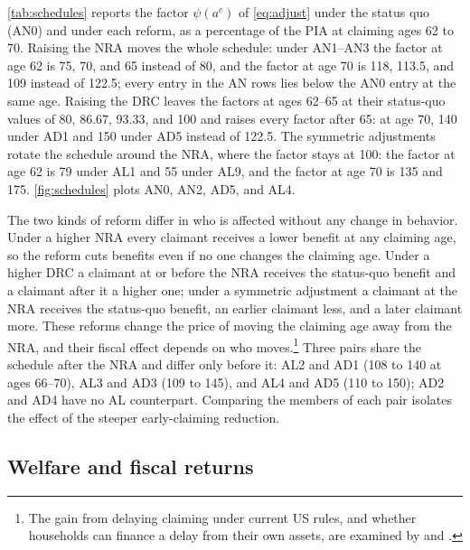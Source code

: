 

\autoref{tab:schedules} reports the factor $\psi(a^c)$ of \eqref{eq:adjust} under the status quo (AN0) and under each reform, as a percentage of the PIA at claiming ages 62 to 70. Raising the NRA moves the whole schedule: under AN1--AN3 the factor at age 62 is 75, 70, and 65 instead of 80, and the factor at age 70 is 118, 113.5, and 109 instead of 122.5; every entry in the AN rows lies below the AN0 entry at the same age. %
Raising the DRC leaves the factors at ages 62--65 at their status-quo values of 80, 86.67, 93.33, and 100 and raises every factor after 65: at age 70, 140 under AD1 and 150 under AD5 instead of 122.5. %
The symmetric adjustments rotate the schedule around the NRA, where the factor stays at 100: the factor at age 62 is 79 under AL1 and 55 under AL9, and the factor at age 70 is 135 and 175. %
\autoref{fig:schedules} plots AN0, AN2, AD5, and AL4. %

The two kinds of reform differ in who is affected without any change in behavior. Under a higher NRA every claimant receives a lower benefit at any claiming age, so the reform cuts benefits even if no one changes the claiming age. %
Under a higher DRC a claimant at or before the NRA receives the status-quo benefit and a claimant after it a higher one; under a symmetric adjustment a claimant at the NRA receives the status-quo benefit, an earlier claimant less, and a later claimant more. These reforms change the price of moving the claiming age away from the NRA, and their fiscal effect depends on who moves.\footnote{The gain from delaying claiming under current US rules, and whether households can finance a delay from their own assets, are examined by \citet{shoven2014does} and \citet{goda2018financial}.} %
Three pairs share the schedule after the NRA and differ only before it: AL2 and AD1 (108 to 140 at ages 66--70), AL3 and AD3 (109 to 145), and AL4 and AD5 (110 to 150); AD2 and AD4 have no AL counterpart. %
Comparing the members of each pair isolates the effect of the steeper early-claiming reduction.

\subsection{Welfare and fiscal returns}\label{subsec:returns}

